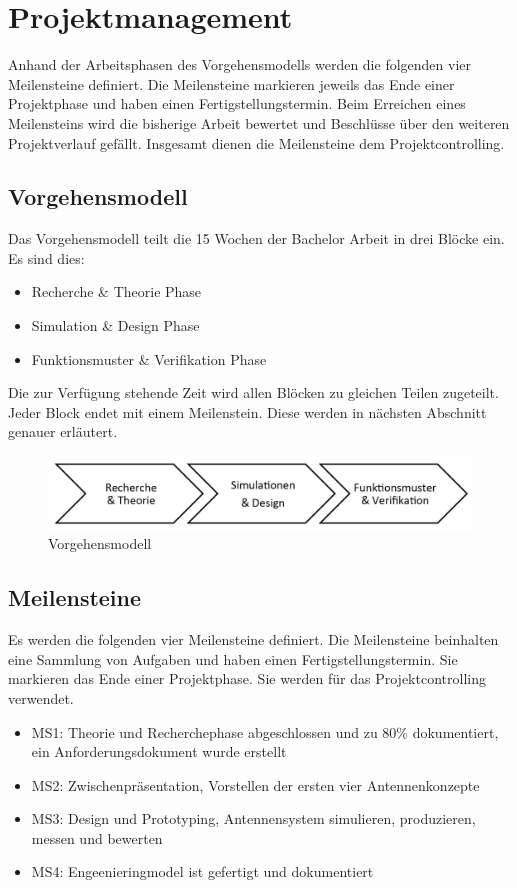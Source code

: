 \newpage
\chapter{Projektmanagement}
Anhand der Arbeitsphasen  des Vorgehensmodells werden die folgenden vier Meilensteine definiert. Die Meilensteine markieren jeweils das Ende einer Projektphase und haben einen Fertigstellungstermin. Beim Erreichen eines Meilensteins wird die bisherige Arbeit bewertet und Beschlüsse über den weiteren Projektverlauf gefällt. Insgesamt dienen die Meilensteine dem Projektcontrolling.
\section{Vorgehensmodell}
Das Vorgehensmodell teilt die 15 Wochen der Bachelor Arbeit in drei Blöcke ein. Es sind dies:
\begin{itemize}
\item Recherche \& Theorie Phase
\item Simulation \& Design Phase
\item Funktionsmuster \& Verifikation Phase
\end{itemize}
Die zur Verfügung stehende Zeit wird allen Blöcken zu gleichen Teilen zugeteilt. Jeder Block endet mit einem Meilenstein. Diese werden in nächsten Abschnitt genauer erläutert.
\begin{figure}[!ht]
	\begin{center}
		\includegraphics[width=16cm]{content/bilder/Vorgehensmodell.pdf}%
	\end{center}
	\caption{Vorgehensmodell}
	\label{Vorgehensmodell}
\end{figure}
\section{Meilensteine}
Es werden die folgenden vier Meilensteine definiert. Die Meilensteine
beinhalten   eine Sammlung von Aufgaben und haben einen
Fertigstellungstermin. Sie markieren das Ende einer Projektphase. Sie
werden für das Projektcontrolling verwendet. 
	\begin{itemize}
		\item MS1: Theorie und Recherchephase abgeschlossen und zu 80\% dokumentiert, ein Anforderungsdokument wurde erstellt
		\item MS2: Zwischenpräsentation, Vorstellen der ersten vier Antennenkonzepte
		\item MS3: Design und Prototyping, Antennensystem simulieren, produzieren, messen und bewerten
		\item MS4: Engeenieringmodel ist gefertigt und dokumentiert
	\end{itemize}





